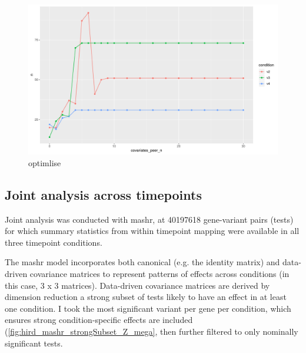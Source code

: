 \begin{figure}
    \centering
    \includegraphics[width=1.0\textwidth,page=1]{mainmatter/figures/chapter_03/count_eGenes.signif_eGenes_vs_PEER_n.dataset_mega.chr_chr1.pdf}
    \caption{optimlise}
    \label{fig:hird_neGenesvsPeerK}
\end{figure}

\subsection{Joint  analysis across timepoints}


Joint analysis was conducted with mashr, at 40197618 gene-variant pairs (tests) for which summary statistics from within timepoint mapping were available in all three timepoint conditions.


The mashr model incorporates both canonical (e.g. the identity matrix) and data-driven covariance matrices to represent patterns of effects across conditions (in this case, 3 x 3 matrices).
Data-driven covariance matrices are derived by dimension reduction a strong subset of tests likely to have an effect in at least one condition.
I took the most significant variant per gene per condition, which ensures strong condition-specific effects are included (\autoref{fig:hird_mashr_strongSubset_Z_mega}, then further filtered to only nominally significant tests.

